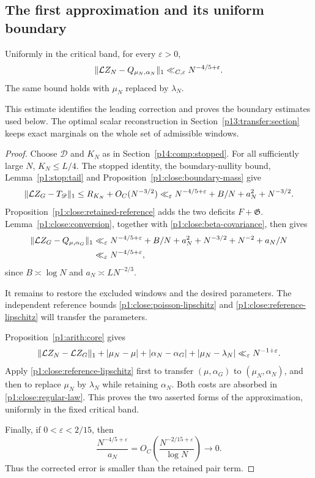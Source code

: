 \subsection{The first approximation and its uniform boundary}

\begin{proposition}
\label{p13:base-approximation}
Uniformly in the critical band, for every \(\varepsilon>0\),
\[
 \|\mathcal L Z_N-Q_{\mu_N,\alpha_N}\|_1
       \ll_{C,\varepsilon}N^{-4/5+\varepsilon}.
\]
The same bound holds with \(\mu_N\) replaced by \(\lambda_N\).
\end{proposition}

This estimate identifies the leading correction and proves the
boundary estimates used below. The optimal scalar reconstruction in
Section~\ref{p13:transfer:section} keeps exact marginals
on the whole set of admissible windows.

\begin{proof}
Choose $\mathscr D$ and $K_N$ as in
Section~\ref{p14:comp:stopped}.  For all sufficiently large $N$,
$K_N\le L/4$.  The stopped identity, the boundary-nullity bound,
Lemma~\ref{p1:stop:tail} and
Proposition~\ref{p1:close:boundary-mass} give
\[
 \|\mathcal L Z_G-T_{\mathscr D}\|_1
 \le R_{K_N}+O_C(N^{-3/2})
 \ll_\varepsilon N^{-4/5+\varepsilon}
                      +B/N+a_N^2+N^{-3/2}.
\]
Proposition~\ref{p1:close:retained-reference} adds the two
deficits $F+\mathfrak G$.
Lemma~\ref{p1:close:conversion}, together with
\eqref{p1:close:beta-covariance}, then gives
\begin{align}
 \|\mathcal L Z_G-Q_{\mu,\alpha_G}\|_1
 &\ll_\varepsilon N^{-4/5+\varepsilon}
             +B/N+a_N^2+N^{-3/2}+N^{-2}+a_N/N \notag\\
 &\ll_\varepsilon N^{-4/5+\varepsilon},
 \label{p1:close:regular-law}
\end{align}
since $B\asymp\log N$ and
$a_N\asymp LN^{-2/3}$.

It remains to restore the excluded windows and the desired
parameters.  The independent reference bounds
\eqref{p1:close:poisson-lipschitz} and
\eqref{p1:close:reference-lipschitz} will transfer the parameters.

Proposition~\ref{p1:arith:core} gives
\[
 \|\mathcal L Z_N-\mathcal L Z_G\|_1
   +|\mu_N-\mu|+|\alpha_N-\alpha_G|
   +|\mu_N-\lambda_N|
      \ll_\varepsilon N^{-1+\varepsilon}.
\]
Apply \eqref{p1:close:reference-lipschitz} first to transfer
$(\mu,\alpha_G)$ to $(\mu_N,\alpha_N)$, and then to replace
$\mu_N$ by $\lambda_N$ while retaining $\alpha_N$.
Both costs are absorbed in \eqref{p1:close:regular-law}.
This proves the two asserted forms of the approximation,
uniformly in the fixed critical band.

Finally, if $0<\varepsilon<2/15$, then
\[
 \frac{N^{-4/5+\varepsilon}}{a_N}
       =O_C\left(\frac{N^{-2/15+\varepsilon}}{\log N}\right)
       \longrightarrow0.
\]
Thus the corrected error is smaller than the retained pair term.
\end{proof}


